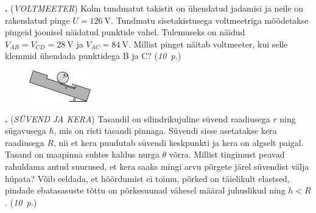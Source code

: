\documentclass[11pt,a5paper]{article}
\newcommand{\numb}[1]{\vspace{5pt}\textbf{\large #1}}
\newcommand{\nimi}[1]{(\textsl{\small #1})}
\newcommand{\punktid}[1]{(\emph{#1~p.})}
\newcounter{ylesanne}
\newcommand{\yl}[1]{\addtocounter{ylesanne}{1}\numb{\theylesanne.} \nimi{#1} \newblock{}}
\newcommand{\autor}[1]{}%
\begin{document}
\yl{VOLTMEETER}
Kolm tundmatut takistit on ühendatud jadamisi ja neile on rakendatud pinge $U=\SI{126}{\volt}$. Tundmatu sisetakistusega voltmeetriga mõõdetakse pingeid joonisel näidatud punktide vahel. Tulemuseks on näidud $V_{AB}=V_{CD}=\SI{28}{\volt}$ ja $V_{AC}=\SI{84}{\volt}$. Millist pinget näitab voltmeeter, kui selle klemmid ühendada punktidega B ja C?
\punktid{10} \autor{Päivo Simson}

\newpage

\begin{figure}
\vspace{-1em}
  \begin{center}
    \includegraphics[width=1\linewidth]{syvend_kera_joonis.pdf}
  \end{center}
  \vspace{-2em}
\end{figure}

\yl{SÜVEND JA KERA}
Tasandil on silindrikujuline süvend raadiusega $r$ ning sügavusega $h$, mis on risti tasandi pinnaga. Süvendi sisse asetatakse kera raadiusega $R$, nii et kera puudutab süvendi keskpunkti ja kera on algselt paigal. Tasand on maapinna suhtes kaldus nurga $\theta$ võrra. Millist tingimust peavad rahuldama antud suurused, et kera saaks mingi arvu põrgete järel süvendist välja hüpata? Võib eeldada, et hõõrdumist ei toimu, põrked on täielikult elastsed, pindade ebatasasuste tõttu on põrkesuunad vähesel määral juhuslikud ning $h < R$.
\punktid{10} \autor{Marko Tsengov}
\end{document}
